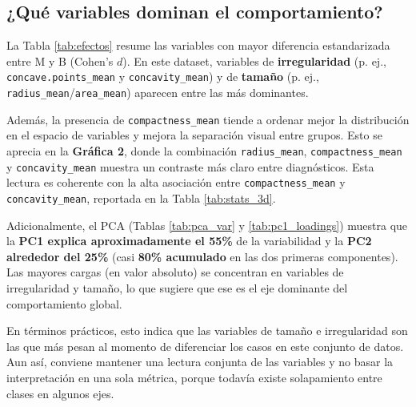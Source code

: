 \documentclass[12pt,a4paper]{article}
\begin{document}
\subsection{¿Qué variables dominan el comportamiento?}
La Tabla \ref{tab:efectos} resume las variables con mayor diferencia estandarizada entre M y B (Cohen's $d$). En este dataset, variables de \textbf{irregularidad} (p. ej., \texttt{concave.points\_mean} y \texttt{concavity\_mean}) y de \textbf{tamaño} (p. ej., \texttt{radius\_mean}/\texttt{area\_mean}) aparecen entre las más dominantes.

Además, la presencia de \texttt{compactness\_mean} tiende a ordenar mejor la distribución en el espacio de variables y mejora la separación visual entre grupos. Esto se aprecia en la \textbf{Gráfica 2}, donde la combinación \texttt{radius\_mean}, \texttt{compactness\_mean} y \texttt{concavity\_mean} muestra un contraste más claro entre diagnósticos. Esta lectura es coherente con la alta asociación entre \texttt{compactness\_mean} y \texttt{concavity\_mean}, reportada en la Tabla \ref{tab:stats_3d}.

Adicionalmente, el PCA (Tablas \ref{tab:pca_var} y \ref{tab:pc1_loadings}) muestra que la \textbf{PC1 explica aproximadamente el 55\%} de la variabilidad y la \textbf{PC2 alrededor del 25\%} (casi \textbf{80\% acumulado} en las dos primeras componentes). Las mayores cargas (en valor absoluto) se concentran en variables de irregularidad y tamaño, lo que sugiere que ese es el eje dominante del comportamiento global.

En términos prácticos, esto indica que las variables de tamaño e irregularidad son las que más pesan al momento de diferenciar los casos en este conjunto de datos. Aun así, conviene mantener una lectura conjunta de las variables y no basar la interpretación en una sola métrica, porque todavía existe solapamiento entre clases en algunos ejes.
\end{document}
